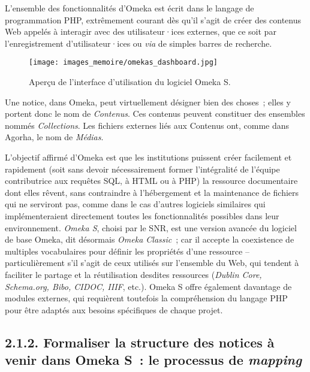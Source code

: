 \documentclass[a4paper,12pt, twoside]{book}
\begin{document}
L’ensemble des fonctionnalités d’Omeka est écrit dans le langage de programmation PHP, extrêmement courant dès qu’il s’agit de créer des contenus Web appelés à interagir avec des utilisateur·ices externes, que ce soit par l’enregistrement d’utilisateur·ices ou \textit{via} de simples barres de recherche.

\begin{figure}[!h]
    \centering
    \texttt{[image: images\_memoire/omekas\_dashboard.jpg]}
    \caption*{Aperçu de l’interface d’utilisation du logiciel Omeka S.}
    \label{Omeka S: Dashboard}
\end{figure}

Une notice, dans Omeka, peut virtuellement désigner bien des choses~; elles y portent donc le nom de \textit{Contenus}. Ces contenus peuvent constituer des ensembles nommés \textit{Collections}. Les fichiers externes liés aux Contenus ont, comme dans Agorha, le nom de \textit{Médias}.

L’objectif affirmé d’Omeka est que les institutions puissent créer facilement et rapidement (soit sans devoir nécessairement former l’intégralité de l’équipe contributrice aux requêtes SQL, à HTML ou à PHP) la ressource documentaire dont elles rêvent, sans contraindre  à l’hébergement et la maintenance de fichiers qui ne serviront pas, comme dans le cas d’autres logiciels similaires qui implémenteraient directement toutes les fonctionnalités possibles dans leur environnement. \textit{Omeka S}, choisi par le SNR,  est une version avancée du logiciel de base Omeka, dit désormais \textit{Omeka Classic}~; car il accepte la coexistence de multiples vocabulaires pour définir les propriétés d’une ressource – particulièrement s’il s’agit de ceux utilisés sur l’ensemble du Web, qui tendent à faciliter le partage et la réutilisation desdites ressources (\textit{Dublin Core, Schema.org, Bibo, CIDOC, IIIF}, etc.). Omeka S offre également davantage de modules externes, qui requièrent toutefois la compréhension du langage PHP pour être adaptés aux besoins spécifiques de chaque projet.

\subsection*{2.1.2. Formaliser la structure des notices à venir dans Omeka S~: le processus de \textit{mapping}}
\end{document}
